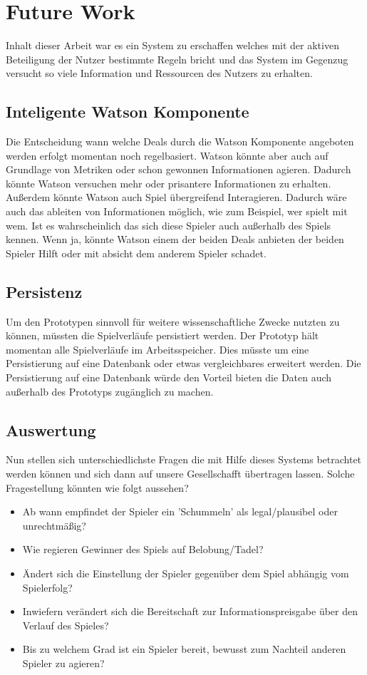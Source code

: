 \documentclass[german]{cgspaper} %
\begin{document}
\section{Future Work}

Inhalt dieser Arbeit war es ein System zu erschaffen welches mit der aktiven Beteiligung der Nutzer bestimmte Regeln bricht und das System im Gegenzug versucht so viele Information und Ressourcen des Nutzers zu erhalten.

\subsection{Inteligente Watson Komponente}

Die Entscheidung wann welche Deals durch die Watson Komponente angeboten werden erfolgt momentan noch regelbasiert.
Watson könnte aber auch auf Grundlage von Metriken oder schon gewonnen Informationen agieren.
Dadurch könnte Watson versuchen mehr oder prisantere Informationen zu erhalten.
Außerdem könnte Watson auch Spiel übergreifend Interagieren.
Dadurch wäre auch das ableiten von Informationen möglich, wie zum Beispiel, wer spielt mit wem.
Ist es wahrscheinlich das sich diese Spieler auch außerhalb des Spiels kennen.
Wenn ja, könnte Watson einem der beiden Deals anbieten der beiden Spieler Hilft oder mit absicht dem anderem Spieler schadet.

\subsection{Persistenz}

Um den Prototypen sinnvoll für weitere wissenschaftliche Zwecke nutzten zu können, müssten die Spielverläufe persistiert werden.
Der Prototyp hält momentan alle Spielverläufe im Arbeitsspeicher.
Dies müsste um eine Persistierung auf eine Datenbank oder etwas vergleichbares erweitert werden.
Die Persistierung auf eine Datenbank würde den Vorteil bieten die Daten auch außerhalb des Prototyps zugänglich zu machen.

\subsection{Auswertung}

Nun stellen sich unterschiedlichste Fragen die mit Hilfe dieses Systems betrachtet werden können und sich dann auf unsere Gesellschafft übertragen lassen.
Solche Fragestellung könnten wie folgt aussehen?

\begin{itemize}
\item Ab wann empfindet der Spieler ein 'Schummeln' als legal/plausibel oder unrechtmäßig?
\item Wie regieren Gewinner des Spiels auf Belobung/Tadel?
\item Ändert sich die Einstellung der Spieler gegenüber dem Spiel abhängig vom Spielerfolg?
\item Inwiefern verändert sich die Bereitschaft zur Informationspreisgabe über den Verlauf des Spieles?
\item Bis zu welchem Grad ist ein Spieler bereit, bewusst zum Nachteil anderen Spieler zu agieren?
\end{itemize}
\end{document}
